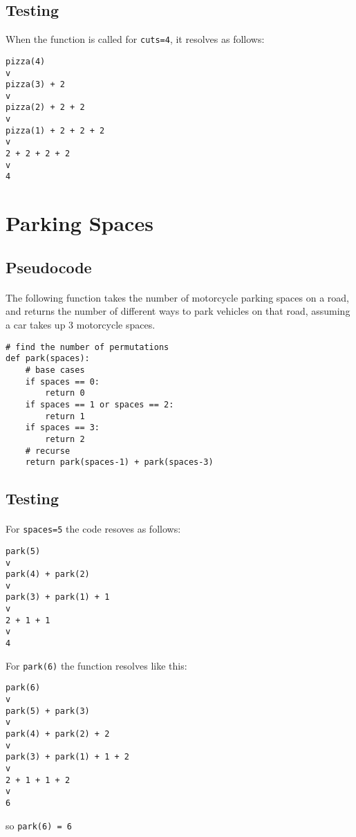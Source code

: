 \documentclass{report}
\begin{document}
\subsection*{Testing}
When the function is called for \texttt{cuts=4}, it resolves as follows:
\begin{lstlisting}
pizza(4)
v
pizza(3) + 2
v
pizza(2) + 2 + 2
v
pizza(1) + 2 + 2 + 2
v
2 + 2 + 2 + 2
v
4
\end{lstlisting}

\section*{Parking Spaces}
\subsection*{Pseudocode}
\paragraph{}
The following function takes the number of motorcycle parking spaces on a road, and returns the number of different ways to park vehicles on that road, assuming a car takes up 3 motorcycle spaces.

\begin{verbatim}
# find the number of permutations
def park(spaces):
    # base cases
    if spaces == 0:
        return 0
    if spaces == 1 or spaces == 2:
        return 1
    if spaces == 3:
        return 2
    # recurse
    return park(spaces-1) + park(spaces-3)
\end{verbatim}
\subsection*{Testing}
\paragraph{}
For \texttt{spaces=5} the code resoves as follows:
\begin{lstlisting}
park(5)
v
park(4) + park(2)
v
park(3) + park(1) + 1
v
2 + 1 + 1
v
4
\end{lstlisting}

For \texttt{park(6)} the function resolves like this:
\begin{lstlisting}
park(6)
v
park(5) + park(3)
v
park(4) + park(2) + 2
v
park(3) + park(1) + 1 + 2
v
2 + 1 + 1 + 2
v
6
\end{lstlisting}

so \texttt{park(6) = 6}
\end{document}
